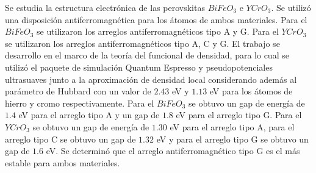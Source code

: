 Se estudia la estructura electr\'onica de las perovskitas $BiFeO_{3}$ e
$YCrO_{3}$. Se utiliz\'o una disposici\'on antiferromagn\'etica para los 
\'atomos de 
ambos materiales. Para el $BiFeO_{3}$ se utilizaron los arreglos 
antiferromagn\'eticos tipo A y G. Para el $YCrO_{3}$ se utilizaron los arreglos 
antiferromagn\'eticos tipo A, C y G. El trabajo 
se desarrollo en el marco de la teor\'ia del funcional de densidad, para lo 
cual se utiliz\'o el paquete de simulaci\'on Quantum Espresso y 
pseudopotenciales ultrasuaves junto a la aproximaci\'on de densidad local 
considerando adem\'as al par\'ametro de Hubbard con un valor de $2.43$ eV y 
$1.13$ 
eV para los \'atomos de hierro y cromo respectivamente. Para el 
$BiFeO_{3}$ se obtuvo un gap de energ\'ia de $1.4$ eV para el arreglo tipo A y 
un 
gap de $1.8$ eV para el arreglo tipo G. Para el $YCrO_{3}$ se obtuvo un gap de 
energ\'ia de $1.30$ eV para el arreglo tipo A, para el arreglo tipo C se obtuvo 
un gap de $1.32$ eV y para el arreglo tipo G se obtuvo un gap de $1.6$ eV. Se 
determin\'o que el arreglo antiferromagn\'etico tipo G es el m\'as estable para 
ambos materiales.
